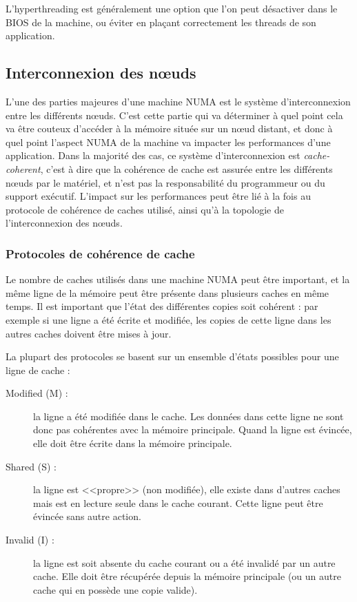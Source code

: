 L'hyperthreading est généralement une option que l'on peut désactiver dans le BIOS de la machine, ou éviter en plaçant correctement les threads de son application.


\subsection{Interconnexion des nœuds}\label{sec:context:numa:interconnect}

L'une des parties majeures d'une machine NUMA est le système d'interconnexion entre les différents nœuds.
C'est cette partie qui va déterminer à quel point cela va être couteux d'accéder à la mémoire située sur un nœud distant, et donc à quel point l'aspect NUMA de la machine va impacter les performances d'une application.
Dans la majorité des cas, ce système d'interconnexion est \emph{cache-coherent}, c'est à dire que la cohérence de cache est assurée entre les différents nœuds par le matériel, et n'est pas la responsabilité du programmeur ou du support exécutif.
L'impact sur les performances peut être lié à la fois au protocole de cohérence de caches utilisé, ainsi qu'à la topologie de l'interconnexion des nœuds.


\subsubsection{Protocoles de cohérence de cache}

Le nombre de caches utilisés dans une machine NUMA peut être important, et la même ligne de la mémoire peut être présente dans plusieurs caches en même temps.
Il est important que l'état des différentes copies soit cohérent : par exemple si une ligne a été écrite et modifiée, les copies de cette ligne dans les autres caches doivent être mises à jour.

La plupart des protocoles se basent sur un ensemble d'états possibles pour une ligne de cache :

\begin{description}
  \item [Modified (M) :] la ligne a été modifiée dans le cache. Les données dans cette ligne ne sont donc pas cohérentes avec la mémoire principale. Quand la ligne est évincée, elle doit être écrite dans la mémoire principale.
  \item [Shared (S) :] la ligne est <<propre>> (non modifiée), elle existe dans d'autres caches mais est en lecture seule dans le cache courant. Cette ligne peut être évincée sans autre action.
  \item [Invalid (I) :] la ligne est soit absente du cache courant ou a été invalidé par un autre cache. Elle doit être récupérée depuis la mémoire principale (ou un autre cache qui en possède une copie valide).
\end{description}

